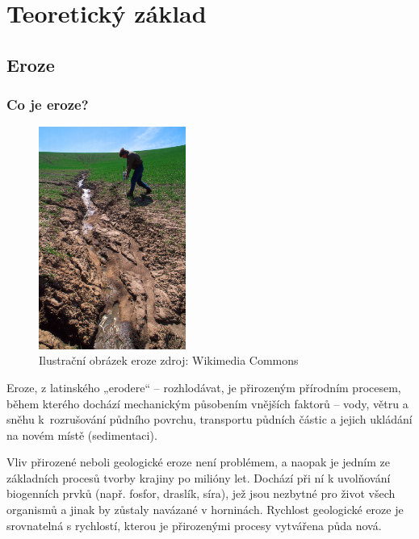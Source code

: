 \chapter{Teoretický základ}
\label{2-teorie}
\section{Eroze}
\subsection{Co je eroze?}
\begin{figure}
\vspace{-16pt}
\centering
\includegraphics[width=0.43\textwidth]{./pictures/erosion.jpg}
\caption[Ilustrační obrázek eroze]{\label{erosion}Ilustrační obrázek eroze zdroj: Wikimedia Commons\cite{wikicommons}}
\vspace{-20pt}
\end{figure}
Eroze, z latinského „erodere“ – rozhlodávat, je přirozeným přírodním procesem, během kterého dochází mechanickým působením vnějších faktorů – vody, větru a sněhu k~rozrušování půdního povrchu, transportu půdních částic a jejich ukládání na novém místě (sedimentaci).\cite{Holy1994}

Vliv přirozené neboli geologické eroze není problémem, a naopak je jedním ze základních procesů tvorby krajiny po milióny let. Dochází při ní k uvolňování biogenních prvků (např. fosfor, draslík, síra), jež jsou nezbytné pro život všech organismů a jinak by zůstaly navázané v horninách. Rychlost geologické eroze je srovnatelná s rychlostí, kterou je přirozenými procesy vytvářena půda nová.\cite{Holy1994}

